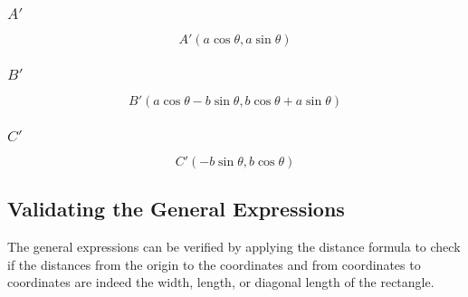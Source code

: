 \documentclass{article}
\begin{document}
        \subsubsection{$A'$}
        \begin{equation}
            A'(a\cos{\theta}, a\sin{\theta})
        \end{equation}
        \subsubsection{$B'$}
        \begin{equation}
            B'(a\cos{\theta} -b\sin{\theta}, b\cos{\theta} + a\sin{\theta})
        \end{equation}
        \subsubsection{$C'$}
        \begin{equation}
            C'(-b\sin{\theta}, b\cos{\theta})
        \end{equation}
        \newpage
        \subsection{Validating the General Expressions} The general expressions can be verified by applying the distance formula to check if the distances from the origin to the coordinates and from coordinates to coordinates are indeed the width, length, or diagonal length of the rectangle.
\end{document}
